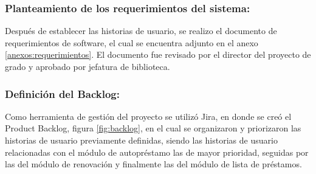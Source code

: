 \documentclass[spanish]{ieee_upb}
\begin{document}
 \begin{table}[H]
\centering
\caption[Nombre en la lista de tablas]{\textbf{Resumen de las Historias de Usuario}}
    \label{tabla:2}
 \end{table}

\subsubsection{ Planteamiento de los requerimientos del sistema:}
 Después de establecer las historias de usuario, se realizo el documento de requerimientos de software, el cual se encuentra adjunto en el anexo \ref{anexos:requerimientos}. El documento fue revisado por el director del proyecto de grado y aprobado por jefatura de biblioteca.

\subsubsection{Definición del Backlog:}
Como herramienta de gestión del proyecto se utilizó Jira, en donde se creó el Product Backlog, figura \ref{fig:backlog}, en el cual se organizaron y priorizaron las historias de usuario previamente definidas, siendo las historias de usuario relacionadas con el módulo de autopréstamo las de mayor prioridad, seguidas por las del módulo de renovación y finalmente las del módulo de lista de préstamos.
\end{document}
